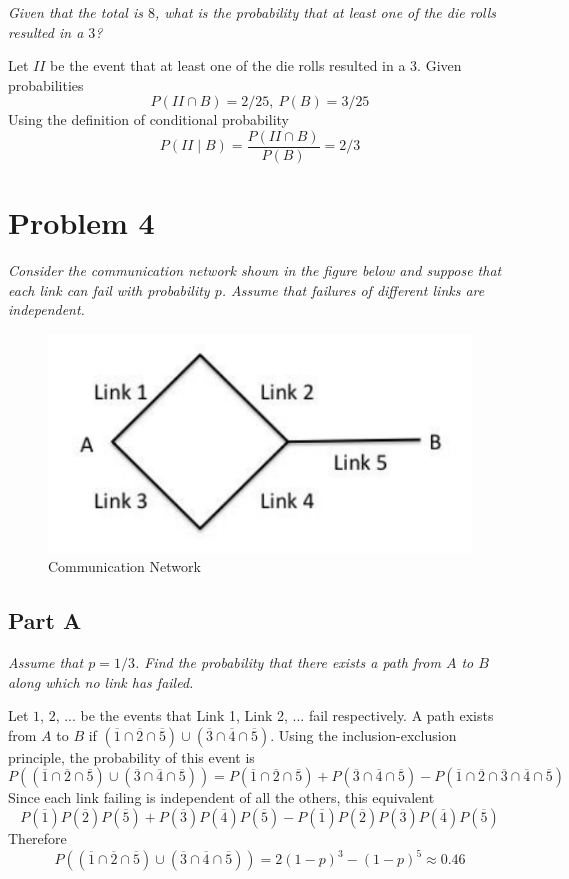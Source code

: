 \documentclass{article}
\begin{document}
\textit{Given that the total is $ 8 $, what is the probability that at least one
of the die rolls resulted in a $ 3 $?}

\bigbreak

Let $ II $ be the event that at least one of the die rolls resulted in a $ 3 $.
Given probabilities
$$ P(II \cap B) = 2/25,\ P(B) = 3/25 $$
Using the definition of conditional probability
$$ P(II \mid B) = \frac{P(II \cap B)}{P(B)} = 2/3 $$

\section*{Problem 4}

\textit{Consider the communication network shown in the figure below and suppose
that each link can fail with probability $ p $. Assume that failures of
different links are independent.}

\begin{figure}[H]
    \centering
    \includegraphics[scale=1]{"P4"}
    \caption{ Communication Network }
\end{figure}

\subsection*{Part A}

\textit{Assume that $ p = 1/3 $. Find the probability that there exists a path
from $ A $ to $ B $ along which no link has failed.}

\bigbreak

Let $ 1 $, $ 2 $, ... be the events that Link 1, Link 2, ... fail respectively.
A path exists from $ A $ to $ B $ if $ (\overline{1} \cap \overline{2} \cap
\overline{5}) \cup (\overline{3} \cap \overline{4} \cap \overline{5}) $. Using
the inclusion-exclusion principle, the probability of this event is
$$ P((\overline{1} \cap \overline{2} \cap \overline{5}) \cup (\overline{3} \cap
\overline{4} \cap \overline{5})) = P(\overline{1} \cap \overline{2} \cap
\overline{5}) + P(\overline{3} \cap \overline{4} \cap \overline{5}) -
P(\overline{1} \cap \overline{2} \cap \overline{3} \cap \overline{4} \cap
\overline{5}) $$
Since each link failing is independent of all the others, this equivalent
$$ P(\overline{1})P(\overline{2})P(\overline{5}) +
P(\overline{3})P(\overline{4})P(\overline{5}) -
P(\overline{1})P(\overline{2})P(\overline{3})P(\overline{4})P(\overline{5}) $$
Therefore
$$ P((\overline{1} \cap \overline{2} \cap \overline{5}) \cup (\overline{3} \cap
\overline{4} \cap \overline{5})) = 2(1 - p)^3 - (1 - p)^5 \approx 0.46 $$
\end{document}
